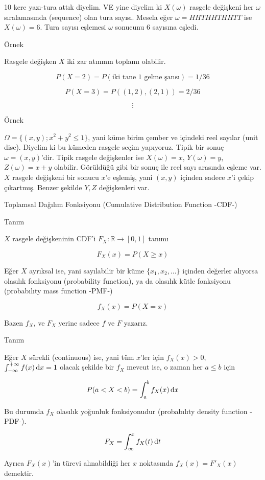 \documentclass[12pt,fleqn]{article}\usepackage{../../common}
\begin{document}
10 kere yazı-tura attık diyelim. VE yine diyelim ki $X(\omega)$ rasgele
değişkeni her $\omega$ sıralamasında (sequence) olan tura sayısı. Mesela
eğer $\omega = HHTHHTHHTT$ ise $X(\omega) = 6$. Tura sayısı eşlemesi
$\omega$ sonucunu 6 sayısına eşledi.

Örnek

Rasgele değişken $X$ iki zar atınının toplamı olabilir. 

$$ P(X=2) = P(\textrm{iki tane 1 gelme şansı}) = 1/36 $$

$$ P(X=3) = P((1,2),(2,1)) = 2/36 $$

$$ \vdots $$

Örnek 

$\Omega = \{ (x,y); x^2+y^2 \le 1 \}$, yani küme birim çember ve içindeki
reel sayılar (unit disc). Diyelim ki bu kümeden rasgele seçim
yapıyoruz. Tipik bir sonuç $\omega = (x,y)$'dir. Tipik rasgele değişkenler
ise $X(\omega) = x$, $Y(\omega) = y$, $Z(\omega) = x+y$ olabilir. Görüldüğü
gibi bir sonuç ile reel sayı arasında eşleme var. $X$ rasgele değişkeni
bir sonucu $x$'e eşlemiş, yani $(x,y)$ içinden sadece $x$'i çekip
çıkartmış. Benzer şekilde $Y,Z$ değişkenleri var. 

Toplamsal Dağılım Fonksiyonu (Cumulative Distribution Function -CDF-)

Tanım

$X$ rasgele değişkeninin CDF'i $F_X: \mathbb{R} \to [0,1]$ tanımı

$$ F_X(x) = P(X \ge x) $$

Eğer $X$ ayrıksal ise, yani sayılabilir bir küme $\{x_1,x_2,...\}$ içinden
değerler alıyorsa olasılık fonksiyonu (probability function), ya da olasılık
kütle fonksiyonu (probabılıty mass function -PMF-)

$$ f_X(x) = P(X = x) $$

Bazen $f_X$, ve $F_X$ yerine sadece $f$ ve $F$ yazarız.

Tanım

Eğer $X$ sürekli (continuous) ise, yani tüm $x$'ler için $f_X(x) > 0$,
$\int_{-\infty}^{+\infty}f(x) \,\mathrm{d} x = 1$ olacak şekilde bir $f_X$ mevcut ise, o
zaman her $a \le b$ için

$$ P(a<X<b) = \int_{a}^{b}f_X(x) \,\mathrm{d} x $$

Bu durumda $f_X$ olasılık yoğunluk fonksiyonudur (probabılıty density function
-PDF-). 

$$ F_X = \int_{\infty}^{x}f_X(t) \,\mathrm{d} t $$

Ayrıca $F_X(x)$'in türevi alınabildiği her $x$ noktasında  $f_X(x) = F'_X(x)$
demektir. 
\end{document}
